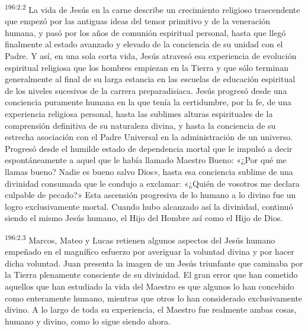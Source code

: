 \par 
\textsuperscript{196:2.2} La vida de Jesús en la carne describe un crecimiento religioso trascendente que empezó por las antiguas ideas del temor primitivo y de la veneración humana, y pasó por los años de comunión espiritual personal, hasta que llegó finalmente al estado avanzado y elevado de la conciencia de su unidad con el Padre. Y así, en una sola corta vida, Jesús atravesó esa experiencia de evolución espiritual religiosa que los hombres empiezan en la Tierra y que sólo terminan generalmente al final de su larga estancia en las escuelas de educación espiritual de los niveles sucesivos de la carrera preparadisiaca. Jesús progresó desde una conciencia puramente humana en la que tenía la certidumbre, por la fe, de una experiencia religiosa personal, hasta las sublimes alturas espirituales de la comprensión definitiva de su naturaleza divina, y hasta la conciencia de su estrecha asociación con el Padre Universal en la administración de un universo. Progresó desde el humilde estado de dependencia mortal que le impulsó a decir espontáneamente a aquel que le había llamado Maestro Bueno: «¿Por qué me llamas bueno? Nadie es bueno salvo Dios», hasta esa conciencia sublime de una divinidad consumada que le condujo a exclamar: «¿Quién de vosotros me declara culpable de pecado?» Esta ascensión progresiva de lo humano a lo divino fue un logro exclusivamente mortal. Cuando hubo alcanzado así la divinidad, continuó siendo el mismo Jesús humano, el Hijo del Hombre así como el Hijo de Dios.

\par 
\textsuperscript{196:2.3} Marcos, Mateo y Lucas retienen algunos aspectos del Jesús humano empeñado en el magnífico esfuerzo por averiguar la voluntad divina y por hacer dicha voluntad. Juan presenta la imagen de un Jesús triunfante que caminaba por la Tierra plenamente consciente de su divinidad. El gran error que han cometido aquellos que han estudiado la vida del Maestro es que algunos lo han concebido como enteramente humano, mientras que otros lo han considerado exclusivamente divino. A lo largo de toda su experiencia, el Maestro fue realmente ambas cosas, humano y divino, como lo sigue siendo ahora.

